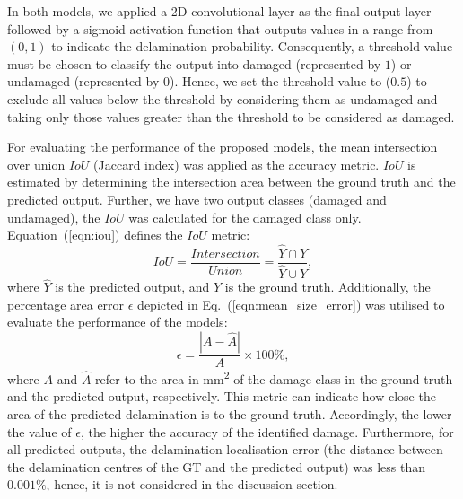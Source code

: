 In both models, we applied a 2D convolutional layer as the final output layer followed by a sigmoid activation function that outputs values in a range from \((0,1)\) to indicate the delamination probability.
Consequently, a threshold value must be chosen to classify the output into damaged (represented by \(1\)) or undamaged (represented by \(0\)).
Hence, we set the threshold value to (\(0.5\)) to exclude all values below the threshold by considering them as undamaged and taking only those values greater than the threshold to be considered as damaged.

For evaluating the performance of the proposed models, the mean 
intersection over union \(IoU\) (Jaccard index) was applied as the accuracy metric. 
\(IoU\) is estimated by determining the intersection
area between the ground truth and the predicted output. 
Further, we have two output classes (damaged and undamaged), the \(IoU\) was calculated for the damaged class only. 
Equation~(\ref{eqn:iou}) defines the \(IoU\) metric: 
\begin{equation}
	IoU=\frac{Intersection}{Union}=\frac{\hat{Y} \cap Y}{\hat{Y} \cup Y},
	\label{eqn:iou}
\end{equation}
where \(\hat{Y}\) is the predicted output, and \(Y\) is the ground truth.
Additionally, the percentage area error $\epsilon$ depicted in Eq.~(\ref{eqn:mean_size_error}) was utilised to evaluate the performance of the models:
\begin{equation}
	\epsilon=\frac{|A-\hat{A}|}{A} \times 100\%,
	\label{eqn:mean_size_error}
\end{equation}
where \(A\) and \(\hat{A}\) refer to the area in mm\textsuperscript{2} of the damage class in the ground truth and the predicted output, respectively.
This metric can indicate how close the area of the predicted delamination is to the ground truth.
Accordingly, the lower the value of $\epsilon$, the higher the accuracy of the identified damage. 
Furthermore, for all predicted outputs, the delamination localisation error (the distance between the delamination centres of the GT and the predicted output) was less than \(0.001\%\), hence, it is not considered in the discussion section.